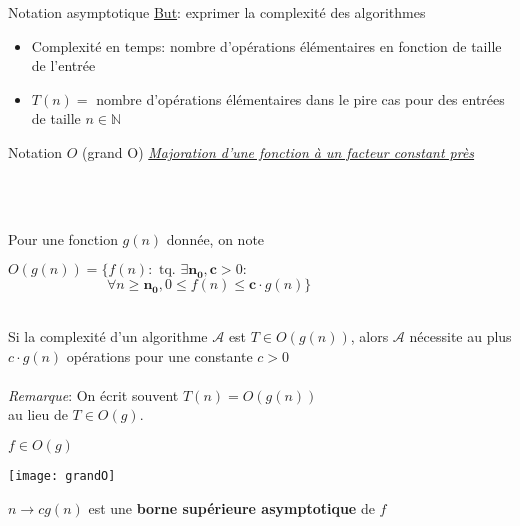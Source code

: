 \begin{frame}{Notation asymptotique}
\underline{But}: exprimer la complexité des algorithmes
  \begin{itemize}
  \item Complexité en temps: nombre d'opérations élémentaires en
    fonction de taille de l'entrée
  \item $T(n) =$ nombre d'opérations élémentaires dans le pire cas
    pour des entrées de taille $n \in \mathbb{N}$
  \end{itemize}
\end{frame}

\begin{frame}{Notation $O$ (grand O)}
  \underline{\emph{Majoration d'une fonction à un facteur constant
      près}}

~\\
~\\
  \begin{definition}
 Pour une fonction $g(n)$ donnée, on note 

$O(g(n)) = \{f(n) : \mbox{ tq. } \exists \mathbf{n_0},\mathbf{c} > 0:$ \\
$~~~~~~~~~~~~~~~~~~~~~~~~~~~~~~~~\forall n \geq \mathbf{n_0}, 0\leq f(n) \leq \mathbf{c}\cdot{}g(n)\}$
  \end{definition}

~\\
 Si la complexité d'un algorithme $\mathcal{A}$ est $T \in O(g(n))$,
    alors $\mathcal{A}$ nécessite au plus $c\cdot{}g(n)$ opérations pour une constante
    $c > 0$
~\\~\\

\emph{Remarque}: On écrit souvent $T(n) = O(g(n))$ \\ au lieu de $T \in
O(g)$. 
\end{frame}

\begin{frame}{$f \in O(g)$}

\texttt{[image: grandO]}  

$n \rightarrow cg(n)$  est une \textbf{borne supérieure asymptotique} de $f$
\end{frame}

